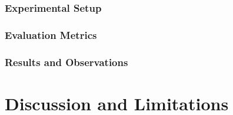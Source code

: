 \documentclass[twocolumn]{article}
\begin{document}
\subsubsection{Experimental Setup}







\subsubsection{Evaluation Metrics}


\subsubsection{Results and Observations}



\section{Discussion and Limitations}
\label{sec:discussion}

\end{document}
